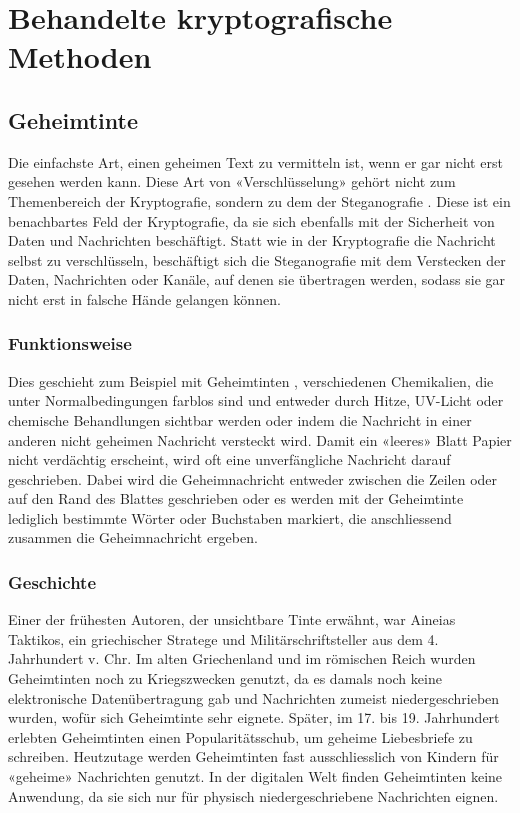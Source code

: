 \section{Behandelte kryptografische Methoden}
\label{sec:kryptographische_methoden}

\subsection{Geheimtinte} %
\label{sec:geheimtinte}

Die einfachste Art, einen geheimen Text zu vermitteln ist, wenn er gar nicht erst gesehen werden kann. Diese Art von «Verschlüsselung» gehört nicht zum Themenbereich der Kryptografie, sondern zu dem der Steganografie \cite{wikipedia:steganografie}. Diese ist ein benachbartes Feld der Kryptografie, da sie sich ebenfalls mit der Sicherheit von Daten und Nachrichten beschäftigt. Statt wie in der Kryptografie die Nachricht selbst zu verschlüsseln, beschäftigt sich die Steganografie mit dem Verstecken der Daten, Nachrichten oder Kanäle, auf denen sie übertragen werden, sodass sie gar nicht erst in falsche Hände gelangen können. 

\subsubsection{Funktionsweise}
\label{sec:funktionsweise}
Dies geschieht zum Beispiel mit Geheimtinten \cite{wikipedia:geheimtinte}, verschiedenen Chemikalien, die unter Normalbedingungen farblos sind und entweder durch Hitze, UV-Licht oder chemische Behandlungen sichtbar werden oder indem die Nachricht in einer anderen nicht geheimen Nachricht versteckt wird. Damit ein «leeres» Blatt Papier nicht verdächtig erscheint, wird oft eine unverfängliche Nachricht darauf geschrieben. Dabei wird die Geheimnachricht entweder zwischen die Zeilen oder auf den Rand des Blattes geschrieben oder es werden mit der Geheimtinte lediglich bestimmte Wörter oder Buchstaben markiert, die anschliessend zusammen die Geheimnachricht ergeben.

\subsubsection{Geschichte}
\label{sec:geschichte}
Einer der frühesten Autoren, der unsichtbare Tinte erwähnt, war Aineias Taktikos, ein griechischer Stratege und Militärschriftsteller aus dem 4. Jahrhundert v. Chr. Im alten Griechenland und im römischen Reich wurden Geheimtinten noch zu Kriegszwecken genutzt, da es damals noch keine elektronische Datenübertragung gab und Nachrichten zumeist niedergeschrieben wurden, wofür sich Geheimtinte sehr eignete. Später, im 17. bis 19. Jahrhundert erlebten Geheimtinten einen Popularitätsschub, um geheime Liebesbriefe zu schreiben. Heutzutage werden Geheimtinten fast ausschliesslich von Kindern für «geheime» Nachrichten genutzt. In der digitalen Welt finden Geheimtinten keine Anwendung, da sie sich nur für physisch niedergeschriebene Nachrichten eignen.

